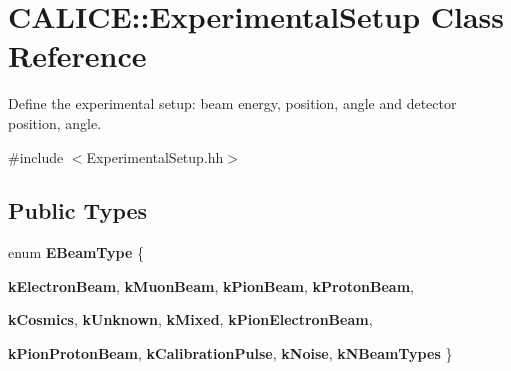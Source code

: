 \section{CALICE::ExperimentalSetup Class Reference}
\label{classCALICE_1_1ExperimentalSetup}


Define the experimental setup: beam energy, position, angle and detector position, angle.  


{\ttfamily \#include $<$ExperimentalSetup.hh$>$}\subsection*{Public Types}
\begin{DoxyCompactItemize}
\item 
enum {\bfseries EBeamType} \{ \par
{\bfseries kElectronBeam}, 
{\bfseries kMuonBeam}, 
{\bfseries kPionBeam}, 
{\bfseries kProtonBeam}, 
\par
{\bfseries kCosmics}, 
{\bfseries kUnknown}, 
{\bfseries kMixed}, 
{\bfseries kPionElectronBeam}, 
\par
{\bfseries kPionProtonBeam}, 
{\bfseries kCalibrationPulse}, 
{\bfseries kNoise}, 
{\bfseries kNBeamTypes}
 \}
\end{DoxyCompactItemize}
